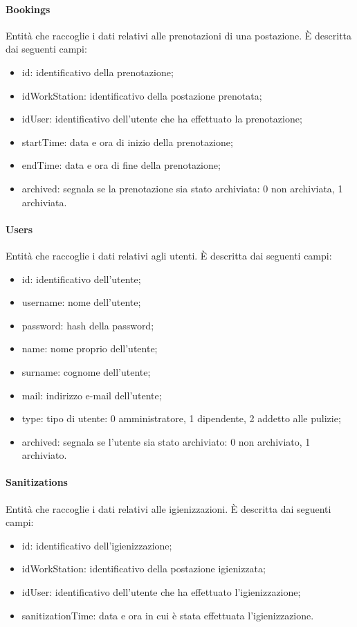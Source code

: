 \paragraph{Bookings}
Entità che raccoglie i dati relativi alle prenotazioni di una postazione. È descritta dai seguenti campi:
\begin{itemize}
	\item id: identificativo della prenotazione;
	\item idWorkStation: identificativo della postazione prenotata;
	\item idUser: identificativo dell'utente che ha effettuato la prenotazione;
	\item startTime: data e ora di inizio della prenotazione;
	\item endTime: data e ora di fine della prenotazione;
	\item archived: segnala se la prenotazione sia stato archiviata: 0 non archiviata, 1 archiviata.
\end{itemize}

\paragraph{Users}
Entità che raccoglie i dati relativi agli utenti. È descritta dai seguenti campi:
\begin{itemize}
	\item id: identificativo dell'utente;
	\item username: nome dell'utente;
	\item password: hash della password;
	\item name: nome proprio dell'utente;
	\item surname: cognome dell'utente;
	\item mail: indirizzo e-mail dell'utente;
	\item type: tipo di utente: 0 amministratore, 1 dipendente, 2 addetto alle pulizie;
	\item archived: segnala se l'utente sia stato archiviato: 0 non archiviato, 1 archiviato.
\end{itemize}

\paragraph{Sanitizations}
Entità che raccoglie i dati relativi alle igienizzazioni. È descritta dai seguenti campi:
\begin{itemize}
	\item id: identificativo dell'igienizzazione;
	\item idWorkStation: identificativo della postazione igienizzata;
	\item idUser: identificativo dell'utente che ha effettuato l'igienizzazione;
	\item sanitizationTime: data e ora in cui è stata effettuata l'igienizzazione.
\end{itemize}

